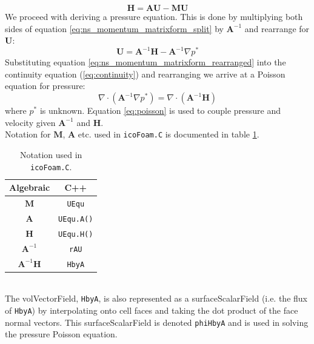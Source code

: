 \documentclass[a4paper,11pt]{report}
\begin{document}
\begin{equation}
    \mathbf{H} = \mathbf{A}\mathbf{U} - \mathbf{M}\mathbf{U}
    \label{eq:h_matrix}
\end{equation}
We proceed with deriving a pressure equation. This is done by multiplying both sides of equation \ref{eq:ns_momentum_matrixform_split} by $\mathbf{A}^{-1}$ and rearrange for $\mathbf{U}$:
\begin{equation}
    \mathbf{U} = \mathbf{A}^{-1}\mathbf{H} - \mathbf{A}^{-1}\nabla{p^*}
    \label{eq:ns_momentum_matrixform_rearranged}
\end{equation}
Substituting equation \ref{eq:ns_momentum_matrixform_rearranged} into the continuity equation (\ref{eq:continuity}) and rearranging we arrive at a Poisson equation for pressure:
\begin{equation}
    \nabla\cdot(\mathbf{A}^{-1}\nabla{p^*}) = \nabla\cdot(\mathbf{A}^{-1}\mathbf{H})
    \label{eq:poisson}
\end{equation}
where $p^*$ is unknown. Equation \ref{eq:poisson} is used to couple pressure and velocity given $\mathbf{A}^{-1}$ and $\mathbf{H}$.
\vspace{5mm}\\
Notation for $\mathbf{M}$, $\mathbf{A}$ etc. used in \texttt{icoFoam.C} is documented in table \ref{table:icofoam_notation}.
\begin{table}[ht]
\begin{center}
\begin{tabular}{ c | c }
    Algebraic & C++ \\
    \hline\hline
    $\mathbf{M}$ & \texttt{UEqu} \\
    \hline
    $\mathbf{A}$ & \texttt{UEqu.A()} \\
    \hline
    $\mathbf{H}$ & \texttt{UEqu.H()} \\
    \hline
    $\mathbf{A}^{-1}$ & \texttt{rAU} \\
    \hline
    $\mathbf{A}^{-1}\mathbf{H}$ & \texttt{HbyA}
\end{tabular}
\end{center}
\caption{Notation used in \texttt{icoFoam.C}.}
\label{table:icofoam_notation}
\end{table}
\vspace{5mm}\\
The volVectorField, \texttt{HbyA}, is also represented as a surfaceScalarField (i.e. the flux of \texttt{HbyA}) by interpolating onto cell faces and taking the dot product of the face normal vectors. This surfaceScalarField is denoted \texttt{phiHbyA} and is used in solving the pressure Poisson equation.
\end{document}
